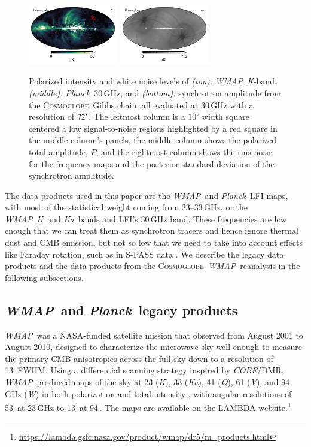 \documentclass[twocolumn]{../../common/aa}
\def\WMAP{\emph{WMAP}}
\def\COBE{\emph{COBE}}
\def\Planck{\emph{Planck}}
\newcommand{\cosmoglobe}{\textsc{Cosmoglobe}}
\newcommand{\K}[0]{\textit K}
\newcommand{\Ka}[0]{\textit{Ka}}
\newcommand{\Q}[0]{\textit Q}
\newcommand{\V}[0]{\textit V}
\newcommand{\W}[0]{\textit W}
\begin{document}
\begin{figure}
	\includegraphics[width=0.35\textwidth]{figures/polint_CG.pdf}
	\includegraphics[width=0.35\textwidth]{figures/polint_CG_sigma.pdf}
	\caption{
		Polarized intensity and white noise levels of \textit{(top):} \WMAP\ \K-band, \textit{(middle):} \Planck\ 30\,GHz, and \textit{(bottom):} synchrotron amplitude from the \cosmoglobe\ Gibbs chain, all evaluated at 30\,GHz with a resolution of $72\arcm$. The leftmost column is a $10^\circ$ width square centered a low signal-to-noise regions highlighted by a red square in the middle column's panels, the middle column shows the polarized total amplitude, $P$, and the rightmost column shows the rms noise for the frequency maps and the posterior standard deviation of the synchrotron amplitude.
		}
       \label{fig:synch_polint}
\end{figure}


The data products used in this paper are the \WMAP\ and \Planck\ LFI maps, with most of the statistical weight coming from 23--33\,GHz, or the \WMAP\ \K\ and \Ka\ bands and LFI's 30\,GHz band. These frequencies are low enough that we can treat them as synchrotron tracers and hence ignore thermal dust and CMB emission, but not so low that we need to take into account effects like Faraday rotation, such as in S-PASS data \citep{krachmalnicoff2018,fuskeland:2019}. We describe the legacy data products and the data products from the \cosmoglobe\ \WMAP\ reanalysis in the following subsections.


\subsection{\WMAP\ and \Planck\ legacy products}
\label{sec:wmap_data}

\WMAP\ was a NASA-funded satellite mission that observed from August 2001 to August 2010, designed to characterize the microwave sky well enough to measure the primary CMB anisotropies across the full sky down to a resolution of 13\arcm\ FWHM. Using a differential scanning strategy inspired by \COBE/DMR,
\WMAP\ produced maps of the sky at 23 (\K), 33 (\Ka), 41 (\Q), 61 (\V), and 94\,GHz (\W) in both polarization and total intensity \citep{bennett2012}, with angular resolutions of 53\arcm\ at 23\,GHz to 13\arcm\ at 94\,\GHz. 
The maps are available on the LAMBDA website.\footnote{\url{https://lambda.gsfc.nasa.gov/product/wmap/dr5/m_products.html}} 
\end{document}
